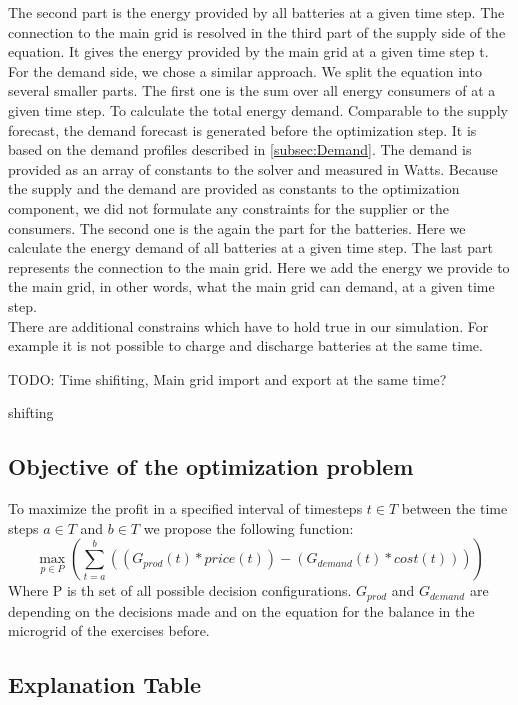 The second part is the energy provided by all batteries at a given time step.
The connection to the main grid is resolved in the third part of the supply side of the equation.
It gives the energy provided by the main grid at a given time step t.\\
For the demand side, we chose a similar approach.
We split the equation into several smaller parts.
The first one is the sum over all energy consumers of at a given time step. To calculate the total energy demand. Comparable to the supply forecast, the demand forecast is generated before the optimization step. It is based on the demand profiles described in \cref{subsec:Demand}. The demand is provided as an array of constants to the solver and measured in Watts. Because the supply and the demand are provided as constants to the optimization component, we did not formulate any constraints for the supplier or the consumers.
The second one is the again the part for the batteries.
Here we calculate the energy demand of all batteries at a given time step.
The last part represents the connection to the main grid.
Here we add the energy we provide to the main grid, in other words, what the main grid can demand, at a given time step.\\

There are additional constrains which have to hold true in our simulation. 
For example it is not possible to charge and discharge batteries at the same time.

TODO: Time shifiting, Main grid import and export at the same time? 

shifting
\subsection{Objective of the optimization problem}
To maximize the profit in a specified interval of timesteps $t \in T$ between the time steps $a \in T$ and $b \in T$ we propose the following function:\\
\begin{equation} \label{eq:opt}
\max_{p \in P}{(\sum_{t=a}^{b}{((G_{prod}(t)*price(t))-(G_{demand}(t)*cost(t)))})}
\end{equation}
Where P is th set of all possible decision configurations. $G_{prod}$ and $G_{demand}$ are depending on the decisions made and on the equation for the balance in the microgrid of the exercises before.
\subsection{Explanation Table}